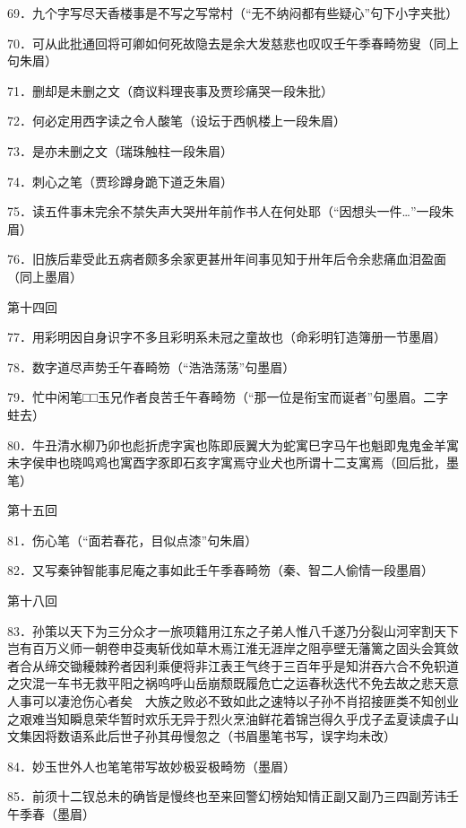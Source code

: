 69．九个字写尽天香楼事是不写之写常村{（\kaishu ``无不纳闷都有些疑心''句下小字夹批）}

70．可从此批通回将可卿如何死故隐去是余大发慈悲也叹叹壬午季春畸笏叟{（\kaishu 同上句朱眉）}

71．删却是未删之文{（\kaishu 商议料理丧事及贾珍痛哭一段朱批）}

72．何必定用西字读之令人酸笔{（\kaishu 设坛于西帆楼上一段朱眉）}

73．是亦未删之文{（\kaishu 瑞珠触柱一段朱眉）}

74．刺心之笔{（\kaishu 贾珍蹲身跪下道乏朱眉）}

75．读五件事未完余不禁失声大哭卅年前作书人在何处耶{（\kaishu ``因想头一件\ldots{}''一段朱眉）}

76．旧族后辈受此五病者颇多余家更甚卅年间事见知于卅年后令余悲痛血泪盈面{（\kaishu 同上墨眉）}

第十四回

77．用彩明因自身识字不多且彩明系未冠之童故也{（\kaishu 命彩明钉造簿册一节墨眉）}

78．数字道尽声势壬午春畸笏{（\kaishu ``浩浩荡荡''句墨眉）}

79．忙中闲笔□□玉兄作者良苦壬午春畸笏{（\kaishu ``那一位是衔宝而诞者''句墨眉。二字蛀去）}

80．牛丑清水柳乃卯也彪折虎字寅也陈即辰翼大为蛇寓巳字马午也魁即鬼鬼金羊寓未字侯申也晓鸣鸡也寓酉字豕即石亥字寓焉守业犬也所谓十二支寓焉{（\kaishu 回后批，墨笔）}

第十五回

81．伤心笔{（\kaishu ``面若春花，目似点漆''句朱眉）}

82．又写秦钟智能事尼庵之事如此壬午季春畸笏{（\kaishu 秦、智二人偷情一段墨眉）}

第十八回

83．孙策以天下为三分众才一旅项籍用江东之子弟人惟八千遂乃分裂山河宰割天下岂有百万义师一朝卷申芟夷斩伐如草木焉江淮无涯岸之阻亭壁无藩篱之固头会箕敛者合从缔交锄耰棘矜者因利乘便将非江表王气终于三百年乎是知洴吞六合不免轵道之灾混一车书无救平阳之祸呜呼山岳崩颓既履危亡之运春秋迭代不免去故之悲天意人事可以凄沧伤心者矣　大族之败必不致如此之速特以子孙不肖招接匪类不知创业之艰难当知瞬息荣华暂时欢乐无异于烈火烹油鲜花着锦岂得久乎戊子孟夏读虞子山文集因将数语系此后世子孙其毋慢忽之{（\kaishu 书眉墨笔书写，误字均未改）}

84．妙玉世外人也笔笔带写故妙极妥极畸笏{（\kaishu 墨眉）}

85．前须十二钗总未的确皆是慢终也至来回警幻榜始知情正副又副乃三四副芳讳壬午季春{（\kaishu 墨眉）}

